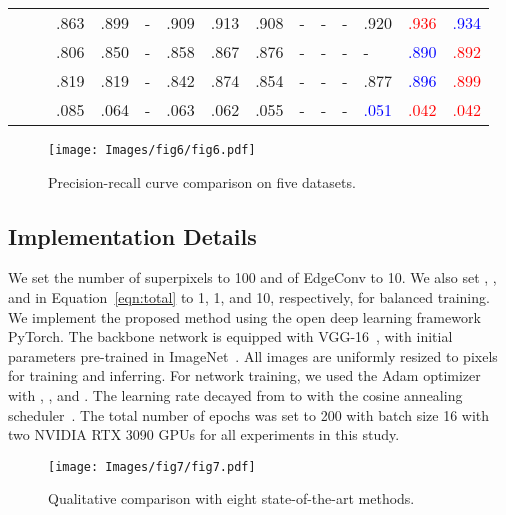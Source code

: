 \documentclass[runningheads]{llncs}
\begin{document}
\begin{table}[t]
\begin{center}
\begin{tabular}{p{0.7cm}<{\centering}|c|p{0.85cm}<{\centering}cp{0.75cm}<{\centering}p{0.75cm}<{\centering}cccccp{0.75cm}<{\centering}|cc}
				\multirow{4}{*}{\rotatebox{90}{SIP}~\rotatebox{90}{~\cite{fan2020rethinking}}}    
				&  
				& .863 & .899 & - & .909 & .913 & .908 & - & - & - & .920 & \textcolor{red}{.936} & \textcolor{blue}{.934} \\
				&  
				& .806 & .850 & - & .858 & .867 & .876 & - & - & - & - & \textcolor{blue}{.890} & \textcolor{red}{.892} \\
				&  
				& .819 & .819 & - & .842 & .874 & .854 & - & - & - & .877 & \textcolor{blue}{.896} & \textcolor{red}{.899} \\
				&  
				& .085 & .064 & - & .063 & .062 & .055 & - & - & - & \textcolor{blue}{.051} & \textcolor{red}{.042} & \textcolor{red}{.042} \\ \hline
				\hline
			\end{tabular}
		\end{center}
	\end{table}
	
	\begin{figure}[t!]
		\setlength{\belowcaptionskip}{-24pt}
		\begin{center}
			\texttt{[image: Images/fig6/fig6.pdf]}
			\caption{Precision-recall curve comparison on five datasets.}
			\label{fig:PR}
		\end{center}
	\end{figure}
	
	
	\subsection{Implementation Details}
	We set the number of superpixels  to 100 and  of EdgeConv to 10. We also set , , and  in Equation~\ref{eqn:total} to 1, 1, and 10, respectively, for balanced training. We implement the proposed method using the open deep learning framework PyTorch. The backbone network is equipped with VGG-16~\cite{simonyan2014very}, with initial parameters pre-trained in ImageNet~\cite{deng2009imagenet}. All images are uniformly resized to  pixels for training and inferring. For network training, we used the Adam optimizer~\cite{kingma2014adam} with , , and . The learning rate decayed from  to  with the cosine annealing scheduler~\cite{loshchilov2016sgdr}. The total number of epochs was set to 200 with batch size 16 with two NVIDIA RTX 3090 GPUs for all experiments in this study.
	
	\begin{figure}[t]
		\setlength{\belowcaptionskip}{-24pt}
		\begin{center}
			\texttt{[image: Images/fig7/fig7.pdf]}
			\caption{Qualitative comparison with eight state-of-the-art methods.}
			\label{fig7}
		\end{center}
	\end{figure} 
	
\end{document}
